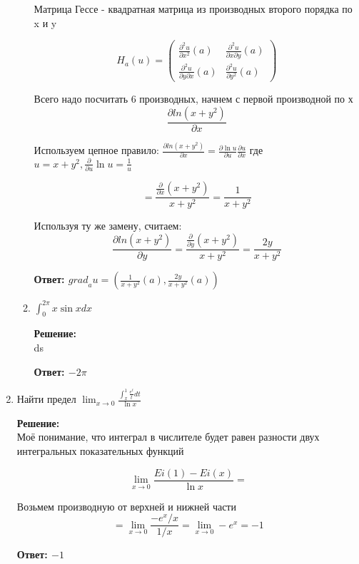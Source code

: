 \documentclass[a4paper,12pt]{article}
\begin{document}
\begin{enumerate}
\begin{enumerate}
Матрица Гессе - квадратная матрица из производных второго порядка по x и y

$$H_a(u) = \begin{pmatrix}
\frac{\partial^2 u}{\partial x^2}(a) & \frac{\partial^2 u}{\partial x \partial y}(a)  \\
\frac{\partial^2 u}{\partial y \partial x}(a) & \frac{\partial^2 u}{\partial y^2}(a) 
\end{pmatrix}$$

Всего надо посчитать 6 производных, начнем с первой производной по х $$\frac{\partial ln(x+y^2)}{\partial x}$$

Используем цепное правило:
$\frac{\partial ln(x+y^2)}{\partial x} = \frac{\partial \ln{u}}{\partial u}\frac{\partial u}{\partial x}$ где $u = x + y^2, \frac{\partial}{\partial u} \ln{u} = \frac{1}{u}$

$$
= \frac{\frac{\partial}{\partial x}(x+y^2)}{x+y^2} = \frac{1}{x+y^2}
$$

Используя ту же замену, считаем: $$\frac{\partial ln(x+y^2)}{\partial y}=\frac{\frac{\partial}{\partial y}(x+y^2)}{x+y^2} = \frac{2y}{x+y^2}$$

\textbf{Ответ: ${grad}_au = (\frac{1}{x+y^2}(a), \frac{2y}{x+y^2}(a))$}

\item 
$
\int^{2\pi}_0 x \sin x dx
$

\textbf{Решение:}\\
ds

\textbf{Ответ: $-2\pi$}


\end{enumerate}

\item Найти предел $\lim_{x \to 0 }\frac{\int_{x}^{1} \frac{e^t}{t} dt}{\ln x}$

\textbf{Решение:}\\
Моё понимание, что интеграл в числителе будет равен разности двух интегральных показательных функций

$$
\lim_{x \to 0 }\frac{Ei(1) - Ei(x)}{\ln x}=
$$

Возьмем производную от верхней и нижней части 
$$= \lim_{x \to 0 }\frac{-e^x / x}{1/x} =\lim_{x \to 0 }-e^x = -1 $$

\textbf{Ответ: $-1$}

\end{enumerate}
\end{document}
